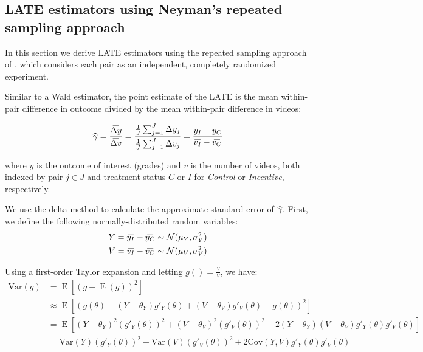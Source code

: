 \documentclass[12pt]{article}
\newcommand\wh[1]{\hstretch{2}{\hat{\hstretch{.5}{#1}}}}
\newcommand\wb[1]{\hstretch{2}{\bar{\hstretch{.5}{#1}}}}
\begin{document}
\subsection{LATE estimators using Neyman's repeated sampling approach} \label{a_neyman_late}

In this section we derive LATE estimators using the repeated sampling approach of \textcite{neyman1923}, which considers each pair as an independent, completely randomized experiment.

Similar to a Wald estimator, the point estimate of the LATE is the mean within-pair difference in outcome divided by the mean within-pair difference in videos:

\begin{equation} \label{neyman_late_spec}
	\wh{\gamma} = \frac{\wb{\Delta y}}{\wb{\Delta v}} = \frac{\frac{1}{J}\sum_{j=1}^{J} \Delta y_j }{\frac{1}{J}\sum_{j=1}^{J} \Delta v_j} = \frac{\wb{y_I} - \wb{y_C}}{\wb{v_I} - \wb{v_C}}
\end{equation}

where $y$ is the outcome of interest (grades) and $v$ is the number of videos, both indexed by pair $j\in J$ and treatment status $C$ or $I$ for \textit{Control} or \textit{Incentive}, respectively.

We use the delta method to calculate the approximate standard error of $\wh{\gamma}$. First, we define the following normally-distributed random variables:
\begin{equation}
\begin{split}
Y = \wb{y_I} - \wb{y_C} \sim \mathcal{N}(\mu_Y, \sigma^2_Y) \\
V = \wb{v_I} - \wb{v_C} \sim \mathcal{N}(\mu_V, \sigma^2_V)
\end{split}
\end{equation}

Using a first-order Taylor expansion and letting $g() = \frac{Y}{V}$, we have:
\begin{equation}
\begin{split}
	\text{Var}(g) & = \operatorname{E}[(g - \operatorname{E}(g))^2] \\
	& \approx \operatorname{E}[(g(\theta) + (Y-\theta_Y)g'_Y(\theta) + (V-\theta_V)g'_V(\theta) - g(\theta))^2] \\
	& = \operatorname{E}[(Y-\theta_Y)^2 (g'_Y(\theta))^2 + (V-\theta_V)^2 (g'_V(\theta))^2 + 2(Y-\theta_Y)(V-\theta_V)g'_Y(\theta)g'_V(\theta)] \\
	& = \text{Var}(Y)(g'_Y(\theta))^2 + \text{Var}(V)(g'_V(\theta))^2 + 2\text{Cov}(Y,V)g'_Y(\theta)g'_V(\theta)
\end{split}
\end{equation}
\end{document}

